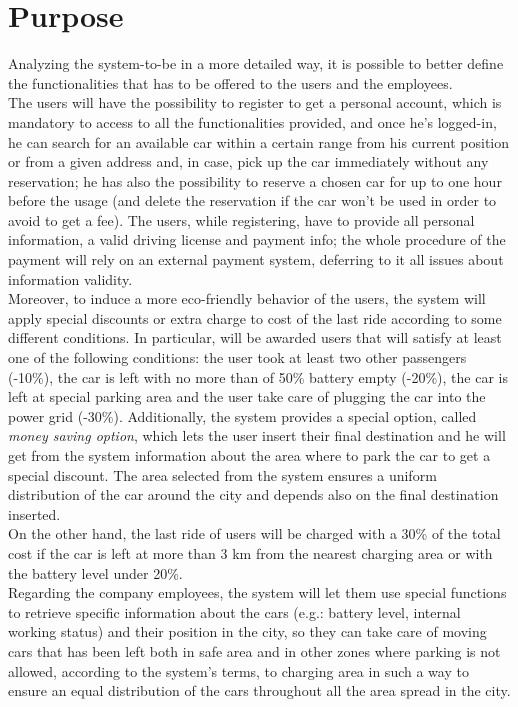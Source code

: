\documentclass[11pt,a4paper]{report}
\begin{document}
\section{Purpose}
Analyzing the system-to-be in a more detailed way, it is possible to better define the functionalities that has to be offered to the users and the employees.\\
The users will have the possibility to register to get a personal account, which is mandatory to access to all the functionalities provided, and once he's logged-in, he can search for an available car within a certain range from his current position or from a given address and, in case, pick up the car immediately without any reservation; he has also the possibility to reserve a chosen car for up to one hour before the usage (and delete the reservation if the car won't be used in order to avoid to get a fee). The users, while registering, have to provide all personal information, a valid driving license and payment info; the whole procedure of the payment will rely on an external payment system, deferring to it all issues about information validity.\\
Moreover, to induce a more eco-friendly behavior of the users, the system will apply special discounts or extra charge to cost of the last ride according to some different conditions. In particular, will be awarded users that will satisfy at least one of the following conditions: the user took at least two other passengers (-10\%), the car is 
left with no more than of 50\% battery empty (-20\%), the car is left at special parking area and the user take care of plugging the car into the power grid (-30\%). Additionally, the system provides a special option, called \textit{money saving option}, which lets the user insert their final destination and he will get from the system information about the area where to park the car to get a special discount. The area selected from the system ensures a uniform distribution of the car around the city and depends also on the final destination inserted.\\
On the other hand, the last ride of users will be charged with a 30\% of the total cost if the car is left at more than 3 km from the nearest charging area or with the battery level under 20\%.\\
Regarding the company employees, the system will let them use special functions to retrieve specific information about the cars (e.g.: battery level, internal working status) and their position in the city, so they can take care of moving cars that has been left both in safe area and in other zones where parking is not allowed, according to the system's terms, to charging area in such a way to ensure an equal distribution of the cars throughout all the area spread in the city.
\end{document}

